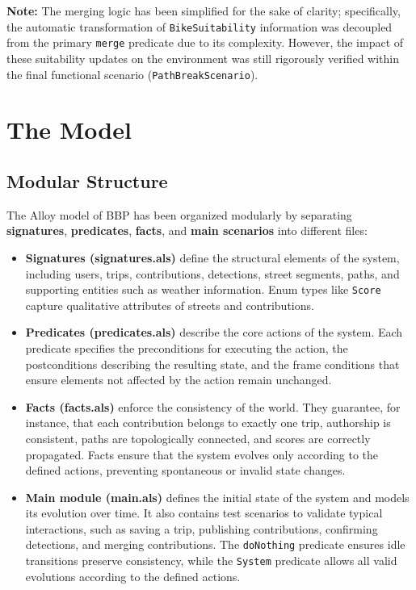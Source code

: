 \textbf{Note:} The merging logic has been simplified for the sake of clarity; specifically, the automatic transformation of \texttt{BikeSuitability} information was decoupled from the primary \texttt{merge} predicate due to its complexity. However, the impact of these suitability updates on the environment was still rigorously verified within the final functional scenario (\texttt{PathBreakScenario}).



\section{The Model}

\subsection{Modular Structure}
The Alloy model of BBP has been organized modularly by separating \textbf{signatures}, \textbf{predicates}, \textbf{facts}, and \textbf{main scenarios} into different files:

\begin{itemize}
    \item \textbf{Signatures (signatures.als)} define the structural elements of the system, including users, trips, contributions, detections, street segments, paths, and supporting entities such as weather information. Enum types like \texttt{Score} capture qualitative attributes of streets and contributions.
    \item \textbf{Predicates (predicates.als)} describe the core actions of the system. Each predicate specifies the preconditions for executing the action, the postconditions describing the resulting state, and the frame conditions that ensure elements not affected by the action remain unchanged.
    \item \textbf{Facts (facts.als)} enforce the consistency of the world. They guarantee, for instance, that each contribution belongs to exactly one trip, authorship is consistent, paths are topologically connected, and scores are correctly propagated. Facts ensure that the system evolves only according to the defined actions, preventing spontaneous or invalid state changes.
    \item \textbf{Main module (main.als)} defines the initial state of the system and models its evolution over time. It also contains test scenarios to validate typical interactions, such as saving a trip, publishing contributions, confirming detections, and merging contributions. The \texttt{doNothing} predicate ensures idle transitions preserve consistency, while the \texttt{System} predicate allows all valid evolutions according to the defined actions.
\end{itemize}

